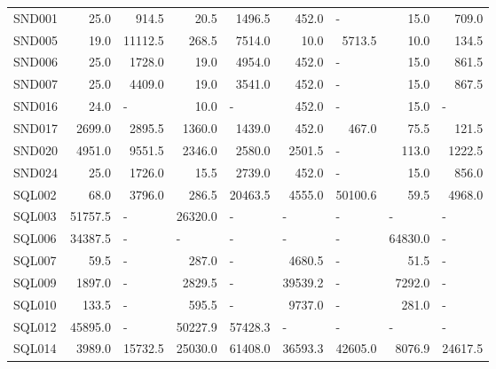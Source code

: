 \documentclass[lettersize,journal]{IEEEtran}
\begin{document}
\begin{table}[t!]
{\begin{tabular}{lrrrrrrrr}
			\midrule
			SND001 & 25.0  & 914.5  & 20.5  & 1496.5  & 452.0  & \multicolumn{1}{l}{-} & 15.0  & 709.0  \\
			SND005 & 19.0  & 11112.5  & 268.5  & 7514.0  & 10.0  & 5713.5  & 10.0  & 134.5  \\
			SND006 & 25.0  & 1728.0  & 19.0  & 4954.0  & 452.0  & \multicolumn{1}{l}{-} & 15.0  & 861.5  \\
			SND007 & 25.0  & 4409.0  & 19.0  & 3541.0  & 452.0  & \multicolumn{1}{l}{-} & 15.0  & 867.5  \\
			SND016 & 24.0  & \multicolumn{1}{l}{-} & 10.0  & \multicolumn{1}{l}{-} & 452.0  & \multicolumn{1}{l}{-} & 15.0  & \multicolumn{1}{l}{-} \\
			SND017 & 2699.0  & 2895.5  & 1360.0  & 1439.0  & 452.0  & 467.0  & 75.5  & 121.5  \\
			SND020 & 4951.0  & 9551.5  & 2346.0  & 2580.0  & 2501.5  & \multicolumn{1}{l}{-} & 113.0  & 1222.5  \\
			SND024 & 25.0  & 1726.0  & 15.5  & 2739.0  & 452.0  & \multicolumn{1}{l}{-} & 15.0  & 856.0  \\
			\midrule
			SQL002 & 68.0  & 3796.0  & 286.5  & 20463.5  & 4555.0  & 50100.6  & 59.5  & 4968.0  \\
			SQL003 & 51757.5  & \multicolumn{1}{l}{-} & 26320.0  & \multicolumn{1}{l}{-} & \multicolumn{1}{l}{-} & \multicolumn{1}{l}{-} & \multicolumn{1}{l}{-} & \multicolumn{1}{l}{-} \\
			SQL006 & 34387.5  & \multicolumn{1}{l}{-} & \multicolumn{1}{l}{-} & \multicolumn{1}{l}{-} & \multicolumn{1}{l}{-} & \multicolumn{1}{l}{-} & 64830.0  & \multicolumn{1}{l}{-} \\
			SQL007 & 59.5  & \multicolumn{1}{l}{-} & 287.0  & \multicolumn{1}{l}{-} & 4680.5  & \multicolumn{1}{l}{-} & 51.5  & \multicolumn{1}{l}{-} \\
			SQL009 & 1897.0  & \multicolumn{1}{l}{-} & 2829.5  & \multicolumn{1}{l}{-} & 39539.2  & \multicolumn{1}{l}{-} & 7292.0  & \multicolumn{1}{l}{-} \\
			SQL010 & 133.5  & \multicolumn{1}{l}{-} & 595.5  & \multicolumn{1}{l}{-} & 9737.0  & \multicolumn{1}{l}{-} & 281.0  & \multicolumn{1}{l}{-} \\
			SQL012 & 45895.0  & \multicolumn{1}{l}{-} & 50227.9  & 57428.3  & \multicolumn{1}{l}{-} & \multicolumn{1}{l}{-} & \multicolumn{1}{l}{-} & \multicolumn{1}{l}{-} \\
			SQL014 & 3989.0  & 15732.5  & 25030.0  & 61408.0  & 36593.3  & 42605.0  & 8076.9  & 24617.5  \\

\end{tabular}}
\end{table}
\end{document}
